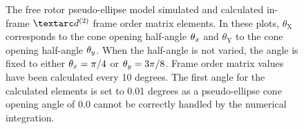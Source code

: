 \begin{figure}
\begin{tabular}{@{}cc@{}}
  \end{tabular}
  \caption[Free rotor pseudo-ellipse simulated and calculated in-frame $\FOtwo$ elements.]{
    The free rotor pseudo-ellipse model simulated and calculated in-frame $\FOtwo$ frame order matrix elements.
    In these plots, $\theta_\textrm{X}$ corresponds to the cone opening half-angle $\theta_x$ and $\theta_\textrm{Y}$ to the cone opening half-angle $\theta_y$.
    When the half-angle is not varied, the angle is fixed to either $\theta_x = \pi/4$ or $\theta_y = 3\pi/8$.
    Frame order matrix values have been calculated every 10 degrees.
    The first angle for the calculated elements is set to 0.01 degrees as a pseudo-ellipse cone opening angle of 0.0 cannot be correctly handled by the numerical integration.
  }
  \label{fig: simulated and calculated in-frame 2nd degree pseudo-ellipse, free rotor frame order}
\end{figure}

